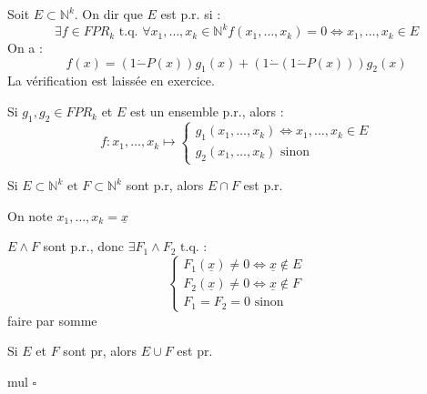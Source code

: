 \begin{definition}\label{def:Epr}
    Soit \(E \subset \mathbb{N}^{k}\). On dir que \(E\) est p.r. si : 
    \[
        \exists f \in FPR_{k} \text{ t.q. } \forall x_{1},\dots,x_{k} \in \mathbb{N}^{k} f(x_{1},\dots,x_{k}) = 0 \iff x_{1},\dots,x_{k} \in E
    \] 
    On a :\\
    \[
        f(x) = (1 \dot{-} P(x))g_{1}(x) + (1\dot{-}(1\dot{-}P(x)))g_{2}(x)
    \]
    La vérification est laissée en exercice. 
\end{definition}

\begin{corollary}[Propriété]\label{col:fsi}
    Si \(g_{1},g_{2} \in FPR_{k}\) et \(E\) est un ensemble p.r., alors : \\
    \[
        f: x_{1},\dots,x_{k} \mapsto \begin{cases}
        g_{1}(x_{1},\dots,x_{k}) \iff x_{1},\dots,x_{k} \in E\\
        g_{2}(x_{1},\dots,x_{k}) \text{ sinon }
        \end{cases}
    \] 
\end{corollary}

\begin{corollary}[Prop]\label{col:intersection}
    Si \(E \subset \mathbb{N}^{k} \text{ et } F \subset \mathbb{N}^{k}\) sont p.r, alors \(E \cap F\) est p.r.  
\end{corollary}

On note \(x_{1},\dots,x_{k} = \underline{x}\) 


\begin{explanation}
    \(E \wedge F\) sont p.r., donc \(\exists F_{1} \wedge F_{2} \text{ t.q. }:\)\\
    \[
        \begin{cases}
        F_{1}(\underline{x}) \neq 0 \iff \underline{x} \not \in E\\
        F_{2}(\underline{x}) \neq 0 \iff \underline{x} \not \in F\\
        F_{1} = F_{2} = 0 \text{ sinon } 
        \end{cases}
    \]  
    faire par somme
\end{explanation}

\begin{corollary}[Union]\label{col:union}
    Si \(E\) et \(F\) sont pr, alors \(E \cup F\) est pr. 
\end{corollary}

\begin{explanation}
    mul \(\square\) 
\end{explanation}

